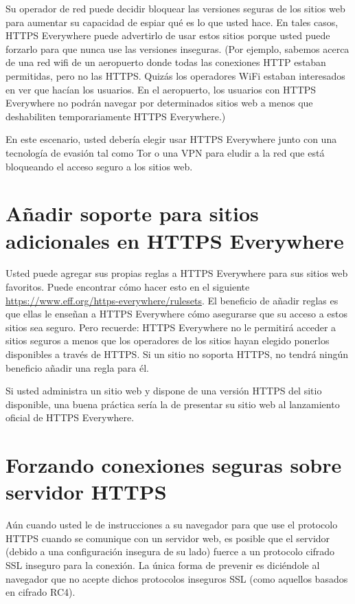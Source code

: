 \documentclass[10pt,a5paper,twoside,,]{book}
\begin{document}
Su operador de red puede decidir bloquear las versiones seguras de los
sitios web para aumentar su capacidad de espiar qué es lo que usted
hace. En tales casos, HTTPS Everywhere puede advertirlo de usar estos
sitios porque usted puede forzarlo para que nunca use las versiones
inseguras. (Por ejemplo, sabemos acerca de una red wifi de un aeropuerto
donde todas las conexiones HTTP estaban permitidas, pero no las HTTPS.
Quizás los operadores WiFi estaban interesados en ver que hacían los
usuarios. En el aeropuerto, los usuarios con HTTPS Everywhere no podrán
navegar por determinados sitios web a menos que deshabiliten
temporariamente HTTPS Everywhere.)

En este escenario, usted debería elegir usar HTTPS Everywhere junto con
una tecnología de evasión tal como Tor o una VPN para eludir a la red
que está bloqueando el acceso seguro a los sitios web.

\section{Añadir soporte para sitios adicionales en HTTPS
Everywhere}\label{auxf1adir-soporte-para-sitios-adicionales-en-https-everywhere}

Usted puede agregar sus propias reglas a HTTPS Everywhere para sus
sitios web favoritos. Puede encontrar cómo hacer esto en el siguiente
\url{https://www.eff.org/https-everywhere/rulesets}. El beneficio de
añadir reglas es que ellas le enseñan a HTTPS Everywhere cómo asegurarse
que su acceso a estos sitios sea seguro. Pero recuerde: HTTPS Everywhere
no le permitirá acceder a sitios seguros a menos que los operadores de
los sitios hayan elegido ponerlos disponibles a través de HTTPS. Si un
sitio no soporta HTTPS, no tendrá ningún beneficio añadir una regla para
él.

Si usted administra un sitio web y dispone de una versión HTTPS del
sitio disponible, una buena práctica sería la de presentar su sitio web
al lanzamiento oficial de HTTPS Everywhere.

\section{Forzando conexiones seguras sobre servidor
HTTPS}\label{forzando-conexiones-seguras-sobre-servidor-https}

Aún cuando usted le de instrucciones a su navegador para que use el
protocolo HTTPS cuando se comunique con un servidor web, es posible que
el servidor (debido a una configuración insegura de su lado) fuerce a un
protocolo cifrado SSL inseguro para la conexión. La única forma de
prevenir es diciéndole al navegador que no acepte dichos protocolos
inseguros SSL (como aquellos basados en cifrado RC4).
\end{document}
